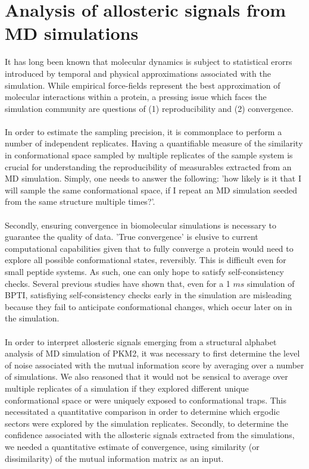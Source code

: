 \documentclass[11pt]{article}
\begin{document}
\section*{Analysis of allosteric signals from MD simulations}
It has long been known that molecular dynamics is subject to statistical erorrs introduced by temporal and physical approximations associated with the simulation. While empirical force-fields represent the best approximation of molecular interactions within a protein, a pressing issue which faces the simulation community are questions of (1) reproducibility and (2) convergence.
\\
\\
In order to estimate the sampling precision, it is commonplace to perform a number of independent replicates. Having a quantifiable measure of the similarity in conformational space sampled by multiple replicates of the sample system is crucial for understanding the reproducibility of measurables extracted from an MD simulation. Simply, one needs to answer the following: 'how likely is it that I will sample the same conformational space, if I repeat an MD simulation seeded from the same structure multiple times?'. 
\\
\\
Secondly, ensuring convergence in biomolecular simulations is necessary to guarantee the quality of data. 'True convergence' is elusive to current computational capabilities given that to fully converge a protein would need to explore all possible conformational states, reversibly. This is difficult even for small peptide systems. As such, one can only hope to satisfy self-consistency checks. Several previous studies have shown that, even for a 1 $ms$ simulation of BPTI, satisfiying self-consistency checks early in the simulation are misleading because they fail to anticipate conformational changes, which occur later on in the simulation.
\\
\\
In order to interpret allosteric signals emerging from a structural alphabet analysis of MD simulation of PKM2, it was necessary to first determine the level of noise associated with the mutual information score by averaging over a number of simulations. We also reasoned that it would not be sensical to average over multiple replicates of a simulation if they explored different unique conformational space or were uniquely exposed to conformational traps. This necessitated a quantitative comparison in order to determine which ergodic sectors were explored by the simulation replicates. Secondly, to determine the confidence associated with the allosteric signals extracted from the simulations, we needed a quantitative estimate of convergence, using similarity (or dissimilarity) of the mutual information matrix as an input. 
\end{document}
